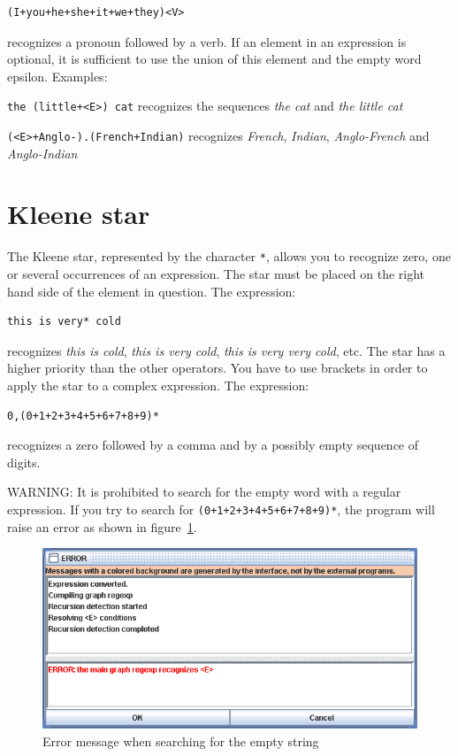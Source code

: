 \begin{verbatim}
(I+you+he+she+it+we+they)<V>
\end{verbatim}

\noindent
recognizes a pronoun followed by a verb. If an element in an
expression is optional, it is sufficient to use the union of this
element and the empty word epsilon.  Examples:

\bigskip
\noindent \verb$the (little+<E>) cat$ recognizes the sequences \textit{the cat}
and \textit{the little cat}

\smallskip
\noindent \verb$(<E>+Anglo-).(French+Indian)$ recognizes \textit{French}, \textit{Indian},
\textit{Anglo-French} and \textit{Anglo-Indian}

\section{Kleene star}
\index{\verb+*+}
The Kleene star, represented by the character \verb+*+,  allows you to recognize
zero, one or several occurrences of an expression. The star must be placed on
the right hand side of the element in question. The expression:

\begin{verbatim}
this is very* cold
\end{verbatim}

\noindent recognizes \textit{this is cold}, \textit{this is very cold},
\textit{this is very very cold}, etc. The star has a higher priority than the
other operators. You have to use brackets in order to apply the star to a complex
expression. The expression:


\begin{verbatim}
0,(0+1+2+3+4+5+6+7+8+9)*
\end{verbatim}

\noindent recognizes a zero followed by a comma and by a possibly empty sequence of
digits.

\bigskip
\noindent WARNING: It is prohibited to search for the empty word with a regular
expression. If you try to search for \verb$(0+1+2+3+4+5+6+7+8+9)*$, the program
will raise an error as shown in
figure~\ref{fig-epsilon-error}.


\bigskip
\begin{figure}[h]
\begin{center}
\includegraphics[width=14cm]{resources/img/fig4-3.png}
\caption{Error message when searching for the empty
string\label{fig-epsilon-error}}
\end{center}
\end{figure}



